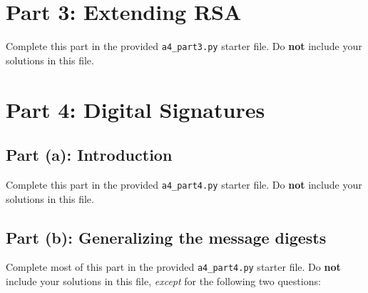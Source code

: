 \documentclass[11pt]{article}
\begin{document}
\newpage

\section*{Part 3: Extending RSA}

Complete this part in the provided \texttt{a4\_part3.py} starter file.
Do \textbf{not} include your solutions in this file.

\section*{Part 4: Digital Signatures}

\subsection*{Part (a): Introduction}

Complete this part in the provided \texttt{a4\_part4.py} starter file.
Do \textbf{not} include your solutions in this file.

\subsection*{Part (b): Generalizing the message digests}

Complete most of this part in the provided \texttt{a4\_part4.py} starter file.
Do \textbf{not} include your solutions in this file, \emph{except} for the following two questions:
\end{document}
